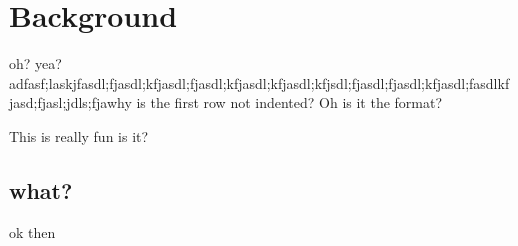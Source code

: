 \chapter{Background}
oh? yea?adfasf;laskjfasdl;fjasdl;kfjasdl;fjasdl;kfjasdl;kfjasdl;kfjsdl;fjasdl;fjasdl;kfjasdl;fasdlkfjasd;fjasl;jdls;fjawhy is the first row not indented? Oh is it the format?

This is really fun is it?

\section{what?}\label{sec:what}

ok then

